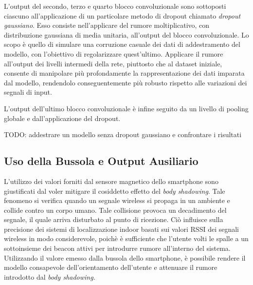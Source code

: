 L'output del secondo, terzo e quarto blocco convoluzionale sono sottoposti
ciascuno all'applicazione di un particolare metodo di dropout chiamato
\emph{dropout gaussiano}. Esso consiste nell'applicare del rumore
moltiplicativo, con distribuzione gaussiana di media unitaria, all'output del
blocco convoluzionale. Lo scopo è quello di simulare una corruzione casuale dei
dati di addestramento del modello, con l'obiettivo di regolarizzare
quest'ultimo. Applicare il rumore all'output dei livelli intermedi della rete,
piuttosto che al dataset iniziale, consente di manipolare più profondamente la
rappresentazione dei dati imparata dal modello, rendendolo conseguentemente più
robusto rispetto alle variazioni dei segnali di input.

L'output dell'ultimo blocco convoluzionale è infine seguito da un livello di
pooling globale e dall'applicazione del dropout.

{\large TODO\@: addestrare un modello senza dropout gaussiano e confrontare i %
  risultati}
\subsection{Uso della Bussola e Output Ausiliario}
L'utilizzo dei valori forniti dal sensore magnetico dello smartphone sono
giustificati dal voler mitigare il cosiddetto effetto del \emph{body
  shadowing}.  Tale fenomeno si verifica quando un segnale wireless si propaga
in un ambiente e collide contro un corpo umano. Tale collisione provoca un
decadimento del segnale, il quale arriva disturbato al punto di ricezione. Ciò
influisce sulla precisione dei sistemi di localizzazione indoor basati sui
valori RSSI dei segnali wireless in modo considerevole, poichè è sufficiente che
l'utente volti le spalle a un sottoinsieme dei beacon attivi per introdurre
rumore all'interno del sistema. Utilizzando il valore emesso dalla bussola
dello smartphone, è possibile rendere il modello consapevole dell'orientamento
dell'utente e attenuare il rumore introdotto dal \emph{body shadowing}.

